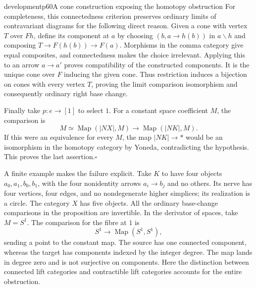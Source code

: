 \begin{dcomment}{development}{p60}{A cone construction exposing the homotopy obstruction}
For completeness, this connectedness criterion preserves ordinary limits of contravariant diagrams for the following direct reason. Given a cone with vertex $T$ over $Fh$, define its component at $a$ by choosing $(b,a\to h(b))$ in $a\backslash h$ and composing $T\to F(h(b))\to F(a)$. Morphisms in the comma category give equal composites, and connectedness makes the choice irrelevant. Applying this to an arrow $a\to a'$ proves compatibility of the constructed components. It is the unique cone over $F$ inducing the given cone. Thus restriction induces a bijection on cones with every vertex $T$, proving the limit comparison isomorphism and consequently ordinary right base change.

Finally take $p:e\to[1]$ to select $1$. For a constant space coefficient $M$, the comparison is
\[
 M\simeq\operatorname{Map}(|NX|,M)
 \longrightarrow\operatorname{Map}(|NK|,M).
\]
If this were an equivalence for every $M$, the map $|NK|\to *$ would be an isomorphism in the homotopy category by Yoneda, contradicting the hypothesis. This proves the last assertion.\hfill$\square$

A finite example makes the failure explicit. Take $K$ to have four objects $a_0,a_1,b_0,b_1$, with the four nonidentity arrows $a_i\to b_j$ and no others. Its nerve has four vertices, four edges, and no nondegenerate higher simplices; its realization is a circle. The category $X$ has five objects. All the ordinary base-change comparisons in the proposition are invertible. In the derivator of spaces, take $M=S^1$. The comparison for the fibre at $1$ is
\[
 S^1\longrightarrow\operatorname{Map}(S^1,S^1),
\]
sending a point to the constant map. The source has one connected component, whereas the target has components indexed by the integer degree. The map lands in degree zero and is not surjective on components. Here the distinction between connected lift categories and contractible lift categories accounts for the entire obstruction.
\end{dcomment}

